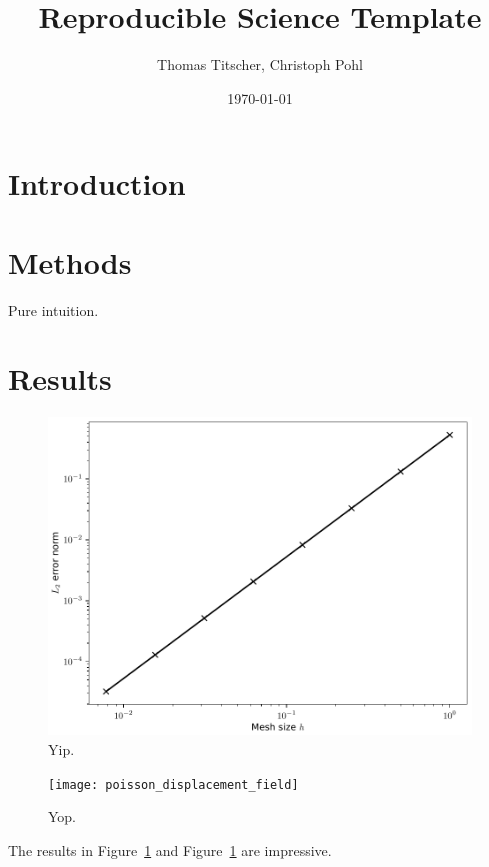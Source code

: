 \documentclass[12pt,abstract]{scrartcl}
\title{Reproducible Science Template}
\author{Thomas Titscher, Christoph Pohl}
\date{\today}
\begin{document}
\maketitle

\begin{abstract}
  \lipsum[10]
\end{abstract}

\section{Introduction}

\lipsum[10]

\section{Methods}

Pure intuition.

\section{Results}

\begin{figure}[bt]
  \centering
  \includegraphics[width=0.6\linewidth]{poisson_convergence}
  \caption{Yip.}%
  \label{fig:poisson_convergence}
\end{figure}

\begin{figure}[bt]
  \centering
  \texttt{[image: poisson\_displacement\_field]}
  \caption{Yop.}%
  \label{fig:poisson_displacement_field}
\end{figure}

The results in Figure~\ref{fig:poisson_convergence} and Figure~\ref{fig:poisson_convergence} are impressive.
\end{document}
